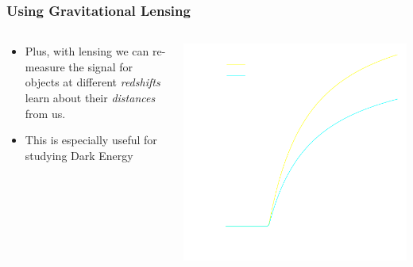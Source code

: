 \documentclass{beamer}
\begin{document}
\frame
{

    \frametitle{Using Gravitational Lensing}


    \begin{columns}
        \begin{column}{0.5\textwidth}
            \begin{itemize}

                \item Plus, with lensing we can re-measure the signal for
                    objects at different {\em redshifts} learn about their {\em
                    distances} from us.

                \item This is especially useful for studying Dark Energy

            \end{itemize}
        \end{column}
        \begin{column}{0.5\textwidth}
            \begin{center}
                \includegraphics[width=\textwidth]{scinv-example-invert.pdf}
            \end{center}

            
        \end{column}
    \end{columns}


}
\end{document}

